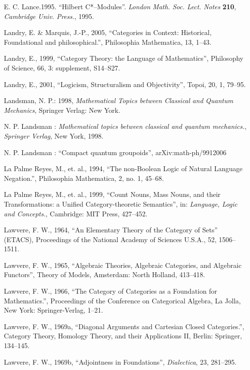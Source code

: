 \documentclass[12pt]{article}
\theoremstyle{plain}
\theoremstyle{definition}
\numberwithin{equation}{section}
\begin{document}
\begin{thebibliography}{99}
E. C. Lance.1995.  ``Hilbert C*--Modules''. \emph{London Math. Soc. Lect.
Notes} \textbf{210}, \emph{Cambridge Univ. Press.}, 1995.

Landry, E. \& Marquis, J.-P., 2005, ``Categories in Context: Historical, Foundational and philosophical.'', Philosophia Mathematica, 13, 1--43.  

Landry, E., 1999, ``Category Theory: the Language of Mathematics'', Philosophy of Science, 66, 3: supplement, S14--S27. 

Landry, E., 2001, ``Logicism, Structuralism and Objectivity'', Topoi, 20, 1, 79--95. 

Landsman, N. P.: 1998, \emph{Mathematical Topics between Classical and Quantum Mechanics}, Springer Verlag: New York.

N. P.  Landsman : {\em Mathematical topics between classical and
quantum mechanics.}, \emph{Springer Verlag}, New York, 1998.

N. P. Landsman : ``Compact quantum groupoids'', arXiv:math-ph/9912006

La Palme Reyes, M., et. al., 1994, ``The non-Boolean Logic of Natural Language Negation.'', Philosophia Mathematica, 2, no. 1, 45--68.

La Palme Reyes, M., et. al., 1999, ``Count Nouns, Mass Nouns, and their Transformations: a Unified Category-theoretic Semantics'', in: {\em Language, Logic and Concepts.}, Cambridge: MIT Press, 427--452.  
 

Lawvere, F. W., 1964, ``An Elementary Theory of the Category of Sets'' (ETACS), Proceedings of the National Academy of Sciences U.S.A., 52, 1506--1511. 

Lawvere, F. W., 1965, ``Algebraic Theories, Algebraic Categories, and Algebraic Functors'', Theory of Models, Amsterdam: North Holland, 413--418.  

Lawvere, F. W., 1966, ``The Category of Categories as a Foundation for Mathematics.'', Proceedings of the Conference on Categorical Algebra, La Jolla, New York: Springer-Verlag, 1--21. 

Lawvere, F. W., 1969a, ``Diagonal Arguments and Cartesian Closed Categories.'', Category Theory, Homology Theory, and their Applications II, Berlin: Springer, 134--145.  

Lawvere, F. W., 1969b, ``Adjointness in Foundations'', {\em Dialectica}, 23, 281--295.  


\end{thebibliography}
\end{document}
